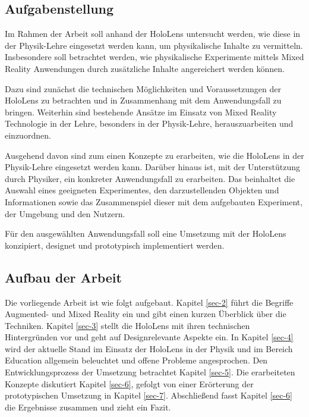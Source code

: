 \subsection{Aufgabenstellung}
\label{sec-1-2}
Im Rahmen der Arbeit soll anhand der HoloLens untersucht werden, wie diese in der Physik-Lehre eingesetzt werden kann, um physikalische Inhalte zu vermitteln. Insbesondere soll betrachtet werden, wie physikalische Experimente mittels Mixed Reality Anwendungen durch zusätzliche Inhalte angereichert werden können.\\

\par
Dazu sind zunächst die technischen Möglichkeiten und Voraussetzungen der HoloLens  zu betrachten und in Zusammenhang mit dem Anwendungsfall zu bringen. Weiterhin sind bestehende Ansätze im Einsatz von Mixed Reality Technologie in der Lehre, besonders in der Physik-Lehre, herauszuarbeiten und einzuordnen.

Ausgehend davon sind zum einen Konzepte zu erarbeiten, wie die HoloLens in der Physik-Lehre eingesetzt werden kann. Darüber hinaus ist, mit der Unterstützung durch Physiker, ein konkreter Anwendungsfall zu erarbeiten. Das beinhaltet die Auswahl eines geeigneten Experimentes, den darzustellenden Objekten und Informationen sowie das Zusammenspiel dieser mit dem aufgebauten Experiment, der Umgebung und den Nutzern.\\

\par
Für den ausgewählten Anwendungsfall soll eine Umsetzung mit der HoloLens konzipiert, designet und prototypisch implementiert werden.

\subsection{Aufbau der Arbeit}
\label{sec-1-3}
Die vorliegende Arbeit ist wie folgt aufgebaut. Kapitel \ref{sec-2} führt die Begriffe Augmented- und Mixed Reality ein und gibt einen kurzen Überblick über die Techniken. Kapitel \ref{sec-3} stellt die HoloLens mit ihren technischen Hintergründen vor und geht auf Designrelevante Aspekte ein. In Kapitel \ref{sec-4} wird der aktuelle Stand im Einsatz der HoloLens in der Physik und im Bereich Education allgemein beleuchtet und offene Probleme angesprochen. Den Entwicklungsprozess der Umsetzung betrachtet Kapitel \ref{sec-5}. Die erarbeiteten Konzepte diskutiert Kapitel \ref{sec-6}, gefolgt von einer Erörterung der prototypischen Umsetzung in Kapitel \ref{sec-7}. Abschließend fasst Kapitel \ref{sec-6} die Ergebnisse zusammen und zieht ein Fazit.